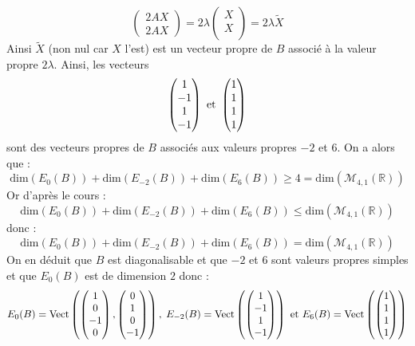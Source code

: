 \documentclass[a4paper,10pt]{report}
\begin{document}
\begin{enumerate}
$$\begin{pmatrix}
2 AX \\
2AX
\end{pmatrix} = 2 \lambda \begin{pmatrix}
X \\
X \\
\end{pmatrix} = 2 \lambda \tilde{X}$$
Ainsi $\tilde{X}$ (non nul car $X$ l'est) est un vecteur propre de $B$ associé à la valeur propre $2 \lambda$. Ainsi, les vecteurs 
$$ \begin{pmatrix}
1 \\
-1 \\
1 \\
-1
\end{pmatrix} \hbox{ et } \begin{pmatrix}
1 \\
1 \\
1 \\
1 \\
\end{pmatrix}$$
sont des vecteurs propres de $B$ associés aux valeurs propres $-2$ et $6$. On a alors que :
$$ \textrm{dim}(E_0(B)) + \textrm{dim}(E_{-2}(B)) + \textrm{dim}(E_6(B))  \geq 4 = \textrm{dim}(\mathcal{M}_{4,1}(\mathbb{R}))$$
Or d'après le cours :
$$ \textrm{dim}(E_0(B)) + \textrm{dim}(E_{-2}(B)) + \textrm{dim}(E_6(B))  \leq \textrm{dim}(\mathcal{M}_{4,1}(\mathbb{R}))$$
donc :
$$ \textrm{dim}(E_0(B)) + \textrm{dim}(E_{-2}(B)) + \textrm{dim}(E_6(B))  = \textrm{dim}(\mathcal{M}_{4,1}(\mathbb{R}))$$
On en déduit que $B$ est diagonalisable et que $-2$ et $6$ sont valeurs propres simples et que $E_0(B)$ est de dimension $2$ donc :
$$ E_0(B) = \textrm{Vect} \left(\begin{pmatrix}
1 \\
0 \\
-1 \\
0
\end{pmatrix},\begin{pmatrix}
0 \\
1 \\
0 \\
-1
\end{pmatrix}\right), \;  E_{-2}(B) = \textrm{Vect} \left( \begin{pmatrix}
1 \\
-1 \\
1 \\
-1
\end{pmatrix}\right) \hbox{ et } E_{6}(B) = \textrm{Vect} \left(\begin{pmatrix}
1 \\
1 \\
1 \\
1
\end{pmatrix}\right)$$
\end{enumerate}
\end{document}
